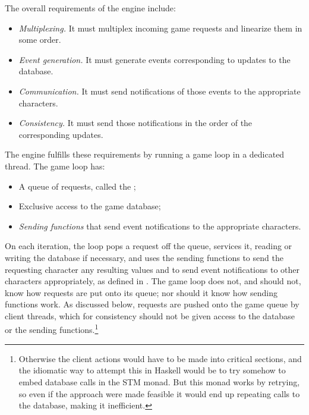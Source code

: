 The overall requirements of the engine include:
\begin{itemize}
    \item {\em Multiplexing.} It must multiplex incoming game requests and
    linearize them in some order.
    \item {\em Event generation.} It must generate events
    corresponding to updates to the database.
    \item {\em Communication.} It must send notifications of those events
    to the appropriate characters.
    \item {\em Consistency.} It must send those notifications in the
    order of the corresponding updates.
\end{itemize}
The engine fulfills these requirements by running a game loop in a dedicated
thread. The game loop has:
\begin{itemize}
    \item A queue of requests, called the ;
    \item Exclusive access to the game database;
    \item {\em Sending functions} that send event notifications to the
    appropriate characters.
\end{itemize}
On each iteration, the loop pops a request off the queue, services it,
reading or writing the database if necessary, and uses the sending
functions to send the requesting character any resulting values and to
send event notifications to other characters appropriately, as defined
in . The game loop does not, and should not,
know how requests are put onto its queue; nor should it know how
sending functions work. As discussed below, requests are pushed onto
the game queue by client threads, which for consistency should not be
given access to the database or the sending
functions.\footnote{Otherwise the client actions would have to be made
into critical sections, and the idiomatic way to attempt this in
Haskell would be to try somehow to embed database calls in the STM
monad. But this monad works by retrying, so even if the approach were
made feasible it would end up repeating calls to the database, making
it inefficient.}

